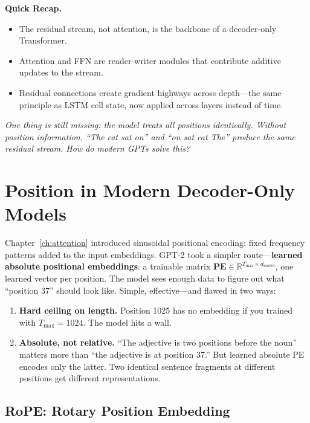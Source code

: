 \begin{quickrecap}
\textbf{Quick Recap.}
\begin{itemize}[nosep,leftmargin=1.5em]
  \item The residual stream, not attention, is the backbone of a decoder-only Transformer.
  \item Attention and FFN are reader-writer modules that contribute additive updates to the stream.
  \item Residual connections create gradient highways across depth---the same principle as LSTM cell state, now applied across layers instead of time.
\end{itemize}
\textit{One thing is still missing: the model treats all positions identically. Without position information, ``The cat sat on'' and ``on sat cat The'' produce the same residual stream. How do modern GPTs solve this?}
\end{quickrecap}


\section{Position in Modern Decoder-Only Models}
\label{sec:position-modern}

Chapter~\ref{ch:attention} introduced sinusoidal positional encoding: fixed frequency patterns added to the input embeddings. GPT-2 took a simpler route---\textbf{learned absolute positional embeddings}: a trainable matrix $\mathbf{PE} \in \mathbb{R}^{T_{\max} \times d_{\text{model}}}$, one learned vector per position. The model sees enough data to figure out what ``position 37'' should look like. Simple, effective---and flawed in two ways:

\begin{enumerate}[nosep]
  \item \textbf{Hard ceiling on length.} Position 1025 has no embedding if you trained with $T_{\max} = 1024$. The model hits a wall.
  \item \textbf{Absolute, not relative.} ``The adjective is two positions before the noun'' matters more than ``the adjective is at position 37.'' But learned absolute PE encodes only the latter. Two identical sentence fragments at different positions get different representations.
\end{enumerate}

\subsection{RoPE: Rotary Position Embedding}

